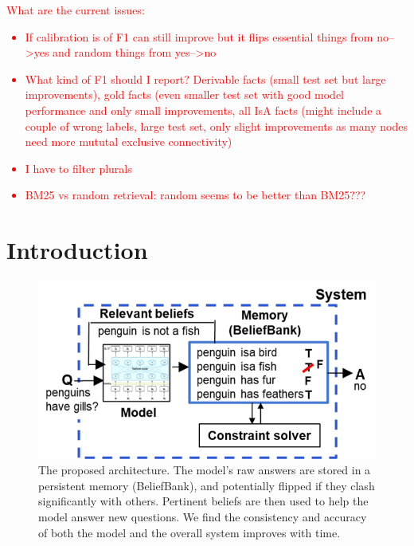 \documentclass[11pt]{article}
\newcommand{\red}[1]{\textcolor{red}{#1}}
\begin{document}
\red{What are the current issues:
\begin{itemize}
    \item If calibration is of F1 can still improve but it flips essential things from no-->yes and random things from yes-->no
    \item What kind of F1 should I report? Derivable facts (small test set but large improvements), gold facts (even smaller test set with good model performance and only small improvements, all IsA facts (might include a couple of wrong labels, large test set, only slight improvements as many nodes need more mututal exclusive connectivity)
    \item I have to filter plurals
    \item BM25 vs random retrieval: random seems to be better than BM25???
\end{itemize}}

\section{Introduction}

\begin{figure}[t]
\centering
     \includegraphics[width=1\columnwidth]{architecture2.png}	   %
\caption{The proposed architecture. The model's raw answers are stored in a
persistent memory (BeliefBank), and potentially flipped if they clash
significantly with others. Pertinent beliefs are then used to help the model answer new
questions. We find the consistency and accuracy of both the model and the overall
system improves with time. \label{architecture}}
\end{figure}
\end{document}
